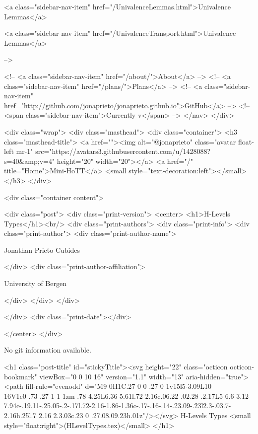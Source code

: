           <a class="sidebar-nav-item" href="/UnivalenceLemmas.html">Univalence Lemmas</a>
        
      
    
      
        
          <a class="sidebar-nav-item" href="/UnivalenceTransport.html">Univalence Lemmas</a>
        
      
     -->

    <!-- <a class="sidebar-nav-item" href="/about/">About</a> -->
    <!-- <a class="sidebar-nav-item" href="/plans/">Plans</a> -->
    <!-- <a class="sidebar-nav-item" href="http://github.com/jonaprieto/jonaprieto.github.io">GitHub</a> -->
    <!-- <span class="sidebar-nav-item">Currently v</span> -->
  </nav>
</div>

    <div class="wrap">
      <div class="masthead">
        <div class="container">
          <h3 class="masthead-title">
            <a href=""><img alt="@jonaprieto" class="avatar float-left mr-1" src="https://avatars3.githubusercontent.com/u/1428088?s=40&amp;v=4" height="20" width="20"></a>
            <a href="/" title="Home">Mini-HoTT</a>
            <small style="text-decoration:left"></small>
          </h3>
        </div>
      
      <div class="container content">
        







<div class="post">
  <div class="print-version">
    <center>
      <h1>H-Levels Types</h1><br/>
        <div class="print-authors">
          <div class="print-info">
            <div class="print-author">
              <div class="print-author-name">
                
                  Jonathan Prieto-Cubides
                
              </div>
              <div class="print-author-affiliation">
                
                  University of Bergen
                
                </div>
            </div>
          </div>
          
          
        </div>
        <div class="print-date"></div>
        
        
    </center>
  </div>

  
  No git information available.
  

  <h1 class="post-title" id="stickyTitle"><svg height="22" class="octicon octicon-bookmark" viewBox="0 0 10 16" version="1.1" width="13" aria-hidden="true"><path fill-rule="evenodd" d="M9 0H1C.27 0 0 .27 0 1v15l5-3.09L10 16V1c0-.73-.27-1-1-1zm-.78 4.25L6.36 5.61l.72 2.16c.06.22-.02.28-.2.17L5 6.6 3.12 7.94c-.19.11-.25.05-.2-.17l.72-2.16-1.86-1.36c-.17-.16-.14-.23.09-.23l2.3-.03.7-2.16h.25l.7 2.16 2.3.03c.23 0 .27.08.09.23h.01z"/></svg> H-Levels Types <small style="float:right">(HLevelTypes.tex)</small>
  </h1>

